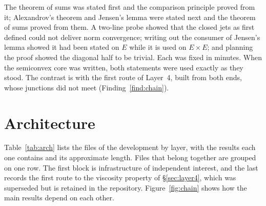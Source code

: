 \documentclass[11pt,reqno]{amsart}
\theoremstyle{plain}
\theoremstyle{definition}
\begin{document}
The theorem of sums was stated first and the comparison principle proved from
it; Alexandrov's theorem and Jensen's lemma were stated next and the theorem of
sums proved from them. A two-line probe showed that the closed jets as first
defined could not deliver norm convergence; writing out the consumer of
Jensen's lemma showed it had been stated on $E$ while it is used on $E \times E$;
and planning the proof showed the diagonal half to be trivial. Each was fixed in
minutes. When the semiconvex core was written, both statements were used
exactly as they stood. The contrast is with the first route of Layer~4, built
from both ends, whose junctions did not meet (Finding~\ref{find:chain}).

\section{Architecture}\label{sec:arch}

Table~\ref{tab:arch} lists the files of the development by layer, with the
results each one contains and its approximate length. Files that belong
together are grouped on one row. The first block is infrastructure of
independent interest, and the last records the first route to the viscosity
property of \S\ref{sec:layer4}, which was superseded but is retained in the
repository. Figure~\ref{fig:chain} shows how the main results depend on each
other.
\end{document}

